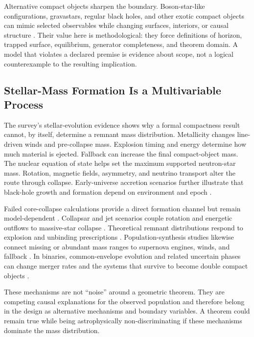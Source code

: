 \documentclass[conference]{IEEEtran}
\begin{document}
Alternative compact objects sharpen the boundary. Boson-star-like configurations, gravastars, regular black holes, and other exotic compact objects can mimic selected observables while changing surfaces, interiors, or causal structure \cite{cardoso2019,mazur2004}. Their value here is methodological: they force definitions of horizon, trapped surface, equilibrium, generator completeness, and theorem domain. A model that violates a declared premise is evidence about scope, not a logical counterexample to the resulting implication.

\subsection{Stellar-Mass Formation Is a Multivariable Process}
The survey's stellar-evolution evidence shows why a formal compactness result cannot, by itself, determine a remnant mass distribution. Metallicity changes line-driven winds and pre-collapse mass. Explosion timing and energy determine how much material is ejected. Fallback can increase the final compact-object mass. The nuclear equation of state helps set the maximum supported neutron-star mass. Rotation, magnetic fields, asymmetry, and neutrino transport alter the route through collapse. Early-universe accretion scenarios further illustrate that black-hole growth and formation depend on environment and epoch \cite{umeda2009}.

Failed core-collapse calculations provide a direct formation channel but remain model-dependent \cite{oconnor2011}. Collapsar and jet scenarios couple rotation and energetic outflows to massive-star collapse \cite{macfadyen2001}. Theoretical remnant distributions respond to explosion and unbinding prescriptions \cite{fryer2001}. Population-synthesis studies likewise connect missing or abundant mass ranges to supernova engines, winds, and fallback \cite{belczynski2012}. In binaries, common-envelope evolution and related uncertain phases can change merger rates and the systems that survive to become double compact objects \cite{dominik2012}.

These mechanisms are not ``noise'' around a geometric theorem. They are competing causal explanations for the observed population and therefore belong in the design as alternative mechanisms and boundary variables. A theorem could remain true while being astrophysically non-discriminating if these mechanisms dominate the mass distribution.
\end{document}
